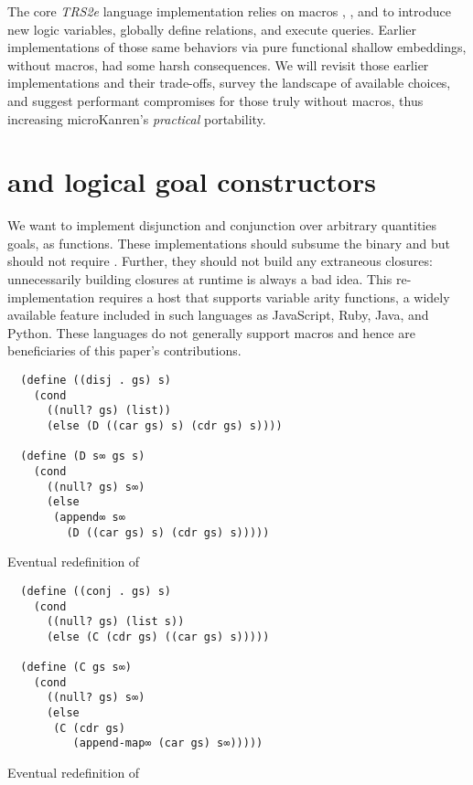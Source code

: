 \documentclass[sigplan,draft,balance,pbalance,natbib=false]{acmart}
\begin{document}
The core \emph{TRS2e} language implementation relies on
macros , , and 
to introduce new logic variables, globally define relations, and
execute queries. Earlier implementations of those same behaviors via
pure functional shallow embeddings, without macros, had some harsh
consequences. We will revisit those earlier implementations and their
trade-offs, survey the landscape of available choices, and suggest
performant compromises for those truly without macros, thus increasing
microKanren's \emph{practical} portability.

\section{ and  logical goal
  constructors}\label{sec:conde}

We want to implement disjunction and conjunction over arbitrary
quantities goals, as functions. These implementations should subsume
the binary  and  but should not
require . Further, they should not build any
extraneous closures: unnecessarily building closures at runtime is
always a bad idea. This re-implementation requires a host that
supports variable arity functions, a widely available feature included
in such languages as JavaScript, Ruby, Java, and Python. These
languages do not generally support macros and hence are beneficiaries
of this paper's contributions.

\begin{listing}
  \begin{verbatim}
  (define ((disj . gs) s)
    (cond
      ((null? gs) (list))
      (else (D ((car gs) s) (cdr gs) s))))

  (define (D s∞ gs s)
    (cond
      ((null? gs) s∞)
      (else
       (append∞ s∞
         (D ((car gs) s) (cdr gs) s)))))
  \end{verbatim}
  \caption{Eventual redefinition of }
  \label{mnt:disj-reimplementation}
\end{listing}

\begin{listing}
  \begin{verbatim}
  (define ((conj . gs) s)
    (cond
      ((null? gs) (list s))
      (else (C (cdr gs) ((car gs) s)))))

  (define (C gs s∞)
    (cond
      ((null? gs) s∞)
      (else
       (C (cdr gs)
          (append-map∞ (car gs) s∞)))))
  \end{verbatim}
  \caption{Eventual redefinition of }
  \label{mnt:conj-reimplementation}
\end{listing}
\end{document}
